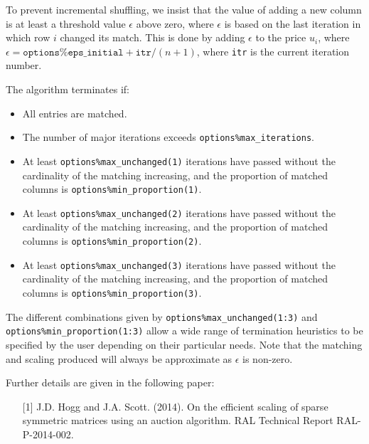 To prevent incremental shuffling, we insist that the value of
adding a new column is at least a threshold value $\epsilon$ above zero, where
$\epsilon$ is based on the last iteration in which row $i$ changed its match.
This is done by adding $\epsilon$ to the price $u_i$, where $\epsilon = \texttt{options\%eps\_initial} + \texttt{itr} / (n+1)$, where \texttt{itr} is the current iteration number.

The algorithm terminates if:
\begin{itemize}
   \item All entries are matched.
   \item The number of major iterations exceeds \texttt{options\%max\_iterations}.
   \item At least \texttt{options\%max\_unchanged(1)} iterations have passed without the cardinality of the matching increasing, and the proportion of matched columns is \texttt{options\%min\_proportion(1)}.
   \item At least \texttt{options\%max\_unchanged(2)} iterations have passed without the cardinality of the matching increasing, and the proportion of matched columns is \texttt{options\%min\_proportion(2)}.
   \item At least \texttt{options\%max\_unchanged(3)} iterations have passed without the cardinality of the matching increasing, and the proportion of matched columns is \texttt{options\%min\_proportion(3)}.
\end{itemize}

The different combinations given by \texttt{options\%max\_unchanged(1:3)}
and
\texttt{options\%min\_proportion(1:3)} allow a wide range of termination
heuristics to be specified by the user depending on their particular needs. Note
that the matching and scaling produced will always be approximate as
$\epsilon$ is non-zero.

\vspace{0.2cm}
\noindent
Further details are given in the following paper:
\vspace{-0.2cm}
\begin{itemize}
   \item[{[1]}] J.D. Hogg and J.A. Scott. (2014). On the efficient scaling of sparse symmetric matrices using an auction algorithm. RAL Technical Report RAL-P-2014-002.
\end{itemize}

